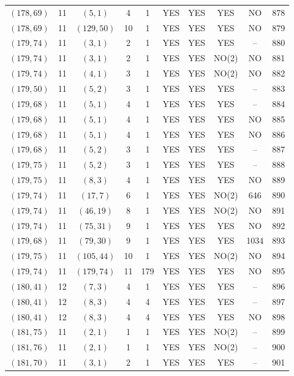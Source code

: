 \begin{longtable}{|c|c|c|c|c|c|c|c|c|c|}
$(178, 69)$ & 11 & $(5, 1)$ & 4 & 1 & YES & YES & YES & NO & 878\\
$(178, 69)$ & 11 & $(129, 50)$ & 10 & 1 & YES & YES & YES & NO & 879\\
$(179, 74)$ & 11 & $(3, 1)$ & 2 & 1 & YES & YES & YES & -- & 880\\
$(179, 74)$ & 11 & $(3, 1)$ & 2 & 1 & YES & YES & NO(2) & NO & 881\\
$(179, 74)$ & 11 & $(4, 1)$ & 3 & 1 & YES & YES & NO(2) & NO & 882\\
$(179, 50)$ & 11 & $(5, 2)$ & 3 & 1 & YES & YES & YES & -- & 883\\
$(179, 68)$ & 11 & $(5, 1)$ & 4 & 1 & YES & YES & YES & -- & 884\\
$(179, 68)$ & 11 & $(5, 1)$ & 4 & 1 & YES & YES & YES & NO & 885\\
$(179, 68)$ & 11 & $(5, 1)$ & 4 & 1 & YES & YES & YES & NO & 886\\
$(179, 68)$ & 11 & $(5, 2)$ & 3 & 1 & YES & YES & YES & -- & 887\\
$(179, 75)$ & 11 & $(5, 2)$ & 3 & 1 & YES & YES & YES & -- & 888\\
$(179, 75)$ & 11 & $(8, 3)$ & 4 & 1 & YES & YES & YES & NO & 889\\
$(179, 74)$ & 11 & $(17, 7)$ & 6 & 1 & YES & YES & NO(2) & 646 & 890\\
$(179, 74)$ & 11 & $(46, 19)$ & 8 & 1 & YES & YES & NO(2) & NO & 891\\
$(179, 74)$ & 11 & $(75, 31)$ & 9 & 1 & YES & YES & YES & NO & 892\\
$(179, 68)$ & 11 & $(79, 30)$ & 9 & 1 & YES & YES & YES & 1034 & 893\\
$(179, 75)$ & 11 & $(105, 44)$ & 10 & 1 & YES & YES & NO(2) & NO & 894\\
$(179, 74)$ & 11 & $(179, 74)$ & 11 & 179 & YES & YES & YES & NO & 895\\
$(180, 41)$ & 12 & $(7, 3)$ & 4 & 1 & YES & YES & YES & -- & 896\\
$(180, 41)$ & 12 & $(8, 3)$ & 4 & 4 & YES & YES & YES & -- & 897\\
$(180, 41)$ & 12 & $(8, 3)$ & 4 & 4 & YES & YES & YES & NO & 898\\
$(181, 75)$ & 11 & $(2, 1)$ & 1 & 1 & YES & YES & NO(2) & -- & 899\\
$(181, 76)$ & 11 & $(2, 1)$ & 1 & 1 & YES & YES & NO(2) & -- & 900\\
$(181, 70)$ & 11 & $(3, 1)$ & 2 & 1 & YES & YES & YES & -- & 901\\

\end{longtable}
